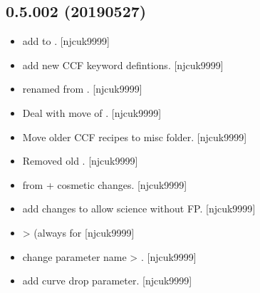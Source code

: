 \documentclass[a4paper,10pt,english]{report}
\begin{document}
\subsection{0.5.002 (2019\sphinxhyphen{}05\sphinxhyphen{}27)}
\label{\detokenize{misc/changelog:id154}}\begin{itemize}
\item {} 
 \sphinxhyphen{} add  to . {[}njcuk9999{]}

\item {} 
 \sphinxhyphen{} add new CCF keyword defintions. {[}njcuk9999{]}

\item {} 
 \sphinxhyphen{} renamed from .
{[}njcuk9999{]}

\item {} 
Deal with move of . {[}njcuk9999{]}

\item {} 
Move older CCF recipes to misc folder. {[}njcuk9999{]}

\item {} 
Removed old . {[}njcuk9999{]}

\item {} 
 \sphinxhyphen{} from  + cosmetic changes.
{[}njcuk9999{]}

\item {} 
 \sphinxhyphen{} add changes to allow science without FP.
{[}njcuk9999{]}

\item {} 
 \sphinxhyphen{}  \textendash{}\textgreater{}  (always
for  {[}njcuk9999{]}

\item {} 
 \sphinxhyphen{} change parameter name  \textendash{}\textgreater{}
. {[}njcuk9999{]}

\item {} 
 \sphinxhyphen{} add curve drop parameter. {[}njcuk9999{]}


\end{itemize}
\end{document}
